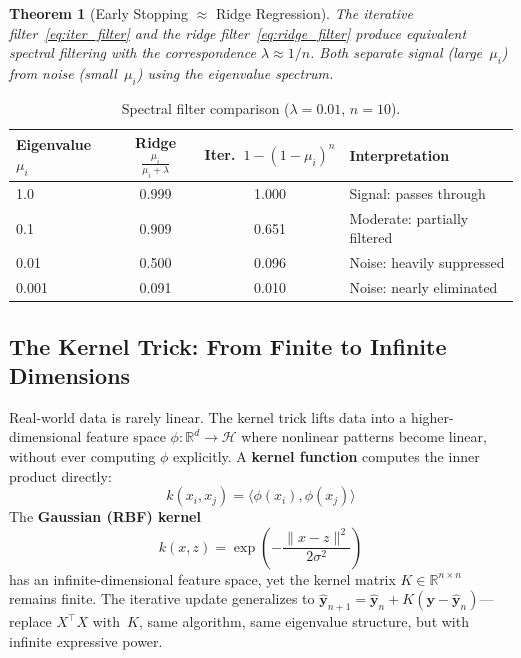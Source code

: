 \documentclass[11pt,a4paper]{article}
\newtheorem{theorem}{Theorem}
\begin{document}
\begin{theorem}[Early Stopping $\approx$ Ridge Regression]
The iterative filter~\eqref{eq:iter_filter} and the ridge filter~\eqref{eq:ridge_filter} produce equivalent spectral filtering with the correspondence $\lambda \approx 1/n$. Both separate signal (large~$\mu_i$) from noise (small~$\mu_i$) using the eigenvalue spectrum.
\end{theorem}

\begin{table}[h]
\centering\small
\begin{tabular}{@{}lccl@{}}
\toprule
Eigenvalue $\mu_i$ & Ridge $\frac{\mu_i}{\mu_i + \lambda}$ & Iter.\ $1-(1-\mu_i)^n$ & Interpretation \\
\midrule
1.0   & 0.999 & 1.000 & Signal: passes through \\
0.1   & 0.909 & 0.651 & Moderate: partially filtered \\
0.01  & 0.500 & 0.096 & Noise: heavily suppressed \\
0.001 & 0.091 & 0.010 & Noise: nearly eliminated \\
\bottomrule
\end{tabular}
\caption{Spectral filter comparison ($\lambda = 0.01$, $n = 10$).}
\end{table}

\subsection{The Kernel Trick: From Finite to Infinite Dimensions}

Real-world data is rarely linear. The kernel trick lifts data into a higher-dimensional feature space $\phi: \mathbb{R}^d \to \mathcal{H}$ where nonlinear patterns become linear, without ever computing $\phi$ explicitly. A \textbf{kernel function} computes the inner product directly:
\begin{equation}
  k(x_i, x_j) = \langle \phi(x_i), \phi(x_j) \rangle
\end{equation}
The \textbf{Gaussian (RBF) kernel}
\begin{equation}\label{eq:gaussian}
  k(x, z) = \exp\!\left(-\frac{\|x - z\|^2}{2\sigma^2}\right)
\end{equation}
has an infinite-dimensional feature space, yet the kernel matrix $K \in \mathbb{R}^{n \times n}$ remains finite. The iterative update generalizes to $\hat{\mathbf{y}}_{n+1} = \hat{\mathbf{y}}_n + K(\mathbf{y} - \hat{\mathbf{y}}_n)$---replace $X^\top X$ with~$K$, same algorithm, same eigenvalue structure, but with infinite expressive power.
\end{document}
